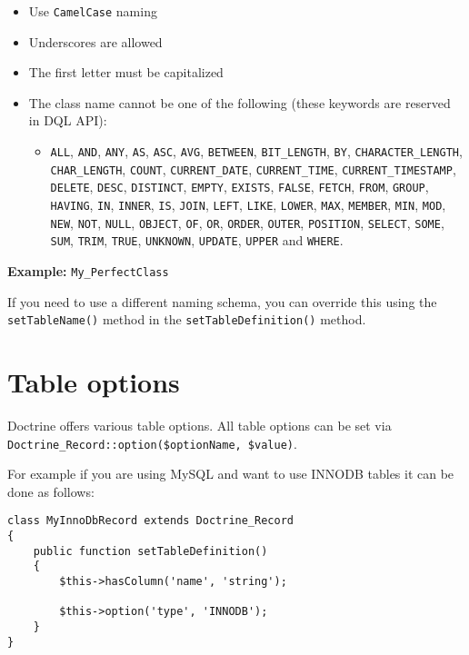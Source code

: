 \documentclass[11pt,a4paper]{report}
\begin{document}
\begin{itemize}
\item{Use \texttt{CamelCase} naming}
\item{Underscores are allowed}
\item{The first letter must be capitalized}
\item{The class name cannot be one of the following (these keywords are reserved in DQL API):}
\begin{itemize}
\item{\texttt{ALL}, \texttt{AND}, \texttt{ANY}, \texttt{AS}, \texttt{ASC}, \texttt{AVG}, \texttt{BETWEEN}, \texttt{BIT\_LENGTH}, \texttt{BY}, \texttt{CHARACTER\_LENGTH}, \texttt{CHAR\_LENGTH}, \texttt{COUNT}, \texttt{CURRENT\_DATE}, \texttt{CURRENT\_TIME}, \texttt{CURRENT\_TIMESTAMP}, \texttt{DELETE}, \texttt{DESC}, \texttt{DISTINCT}, \texttt{EMPTY}, \texttt{EXISTS}, \texttt{FALSE}, \texttt{FETCH}, \texttt{FROM}, \texttt{GROUP}, \texttt{HAVING}, \texttt{IN}, \texttt{INNER}, \texttt{IS}, \texttt{JOIN}, \texttt{LEFT}, \texttt{LIKE}, \texttt{LOWER}, \texttt{MAX}, \texttt{MEMBER}, \texttt{MIN}, \texttt{MOD}, \texttt{NEW}, \texttt{NOT}, \texttt{NULL}, \texttt{OBJECT}, \texttt{OF}, \texttt{OR}, \texttt{ORDER}, \texttt{OUTER}, \texttt{POSITION}, \texttt{SELECT}, \texttt{SOME}, \texttt{SUM}, \texttt{TRIM}, \texttt{TRUE}, \texttt{UNKNOWN}, \texttt{UPDATE}, \texttt{UPPER} and \texttt{WHERE}.}
\end{itemize}
\end{itemize}
\textbf{Example:} \texttt{My\_PerfectClass}

If you need to use a different naming schema, you can override this using the \texttt{setTableName()} method in the \texttt{setTableDefinition()} method.

\section{Table options}
Doctrine offers various table options. All table options can be set via \texttt{Doctrine\_Record::option(\$optionName, \$value)}.

For example if you are using MySQL and want to use INNODB tables it can be done as follows:

\begin{verbatim}
class MyInnoDbRecord extends Doctrine_Record
{
    public function setTableDefinition()
    {
        $this->hasColumn('name', 'string');

        $this->option('type', 'INNODB');
    }
}
\end{verbatim}
\end{document}
